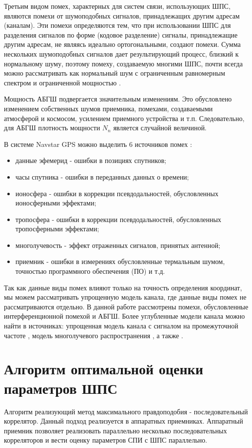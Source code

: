 Третьим видом помех, характерных для систем связи, использующих ШПС, являются помехи от шумоподобных сигналов,
принадлежащих другим адресам (каналам). Эти помехи определяются тем, что при использовании ШПС для разделения
сигналов по форме (кодовое разделение) сигналы, принадлежащие другим адресам, не являясь идеально ортогональными,
создают помехи. Сумма нескольких шумоподобных сигналов дает результирующий процесс, близкий к нормальному шуму,
поэтому помеху, создаваемую многими ШПС, почти всегда можно рассматривать как нормальный шум с ограниченным
равномерным спектром и ограниченной мощностью \cite{pestryakov-book}.

Мощность АБГШ подвергается значительным изменениям. Это обусловлено
изменением собственных шумов приемника, помехами, создаваемыми атмосферой и космосом, усилением приемного устройства
и т.п. Следовательно, для АБГШ плотность мощности ${N_n}$ является случайной величиной.

В системе Navstar GPS можно выделить 6 источников помех \cite{parkinson_1996}:
\begin{itemize}
	\item {данные эфемерид - ошибки в позициях спутников;}
	\item {часы спутника - ошибки в переданных данных о времени;}
	\item {ионосфера - ошибки в коррекции псевдодальностей, обусловленных ионосферными эффектами;}
	\item {тропосфера - ошибки в коррекции псевдодальностей, обусловленных тропосферными эффектами;}
	\item {многолучевость - эффект отраженных сигналов, принятых антенной;}
	\item {приемник - ошибки в измерениях обусловленные термальным шумом, точностью программного обеспечения (ПО) и т.д.}
\end{itemize}

Так как данные виды помех влияют только на точность определения координат, мы можем рассматривать упрощенную модель
канала, где данные виды помех не рассматриваются отдельно. В данной работе рассмотрены помехи, обусловленные интерференционной помехой и АБГШ. 
Более углубленные модели канала можно найти в
источниках: упрощенная модель канала с сигналом на промежуточной частоте \cite{lei_dong_phd}, модель многолучевого
распространения \cite{hannah_phd}, а также \cite{burns_model, corbell_model, brown_model}.

\section{Алгоритм оптимальной оценки параметров ШПС}
Алгоритм реализующий метод максимального правдоподобия - последовательный коррелятор. Данный подход реализуется в аппаратных приемниках.
Аппаратный приемник позволяет реализовать параллельно несколько последовательных корреляторов и вести оценку параметров
СПИ с ШПС параллельно.

